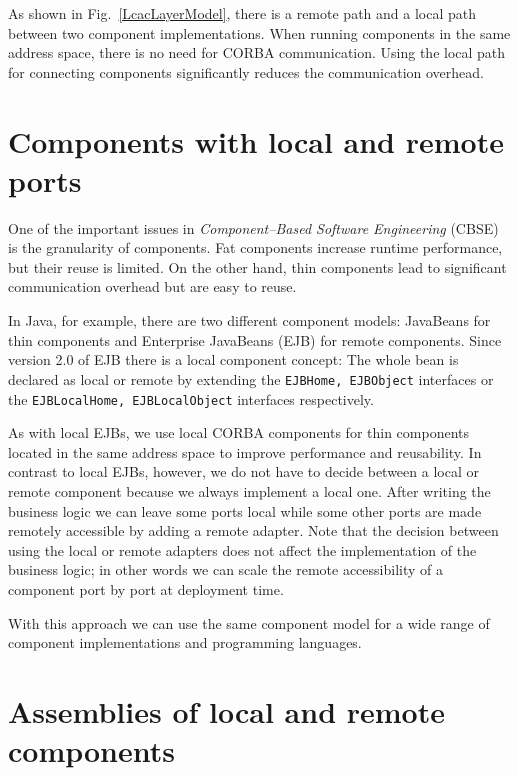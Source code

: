 \noindent
As shown in Fig.~\ref{LcacLayerModel}, there is a remote path and a local path
between two component implementations.
When running components in the same address space, there is no need for CORBA
communication. Using the local path for connecting components significantly reduces
the communication overhead.


\section{Components with local and remote ports}

One of the important issues in {\it Component--Based Software Engineering} (CBSE) 
\cite{CBSE2001} is the granularity of components. 
Fat components increase runtime performance, but their reuse is limited.
On the other hand, thin components lead to significant communication overhead
but are easy to reuse.

In Java, for example, there are two different component models: JavaBeans \cite{Englander1997} 
for thin components and Enterprise JavaBeans (EJB) \cite{EJBSpecificationV2_0} 
for remote components.
Since version 2.0 of EJB there is a local component concept: The whole 
bean is declared as local or remote by extending the {\tt EJBHome, EJBObject} 
interfaces or the {\tt EJBLocalHome, EJBLocalObject} interfaces respectively. 

As with local EJBs, we use local CORBA components for thin components located in 
the same address space to improve performance and reusability.
In contrast to local EJBs, however, we do not have to decide between a local or remote
component because we always implement a local one.
After writing the business logic we can leave some ports local while some other ports
are made remotely accessible by adding a remote adapter. 
Note that the decision between using the local or remote adapters does not
affect the implementation of the business logic; in other words we can scale
the remote accessibility of a component port by port at deployment time.

With this approach we can use the same component model for a wide range of 
component implementations and programming languages.


\section{Assemblies of local and remote components}

